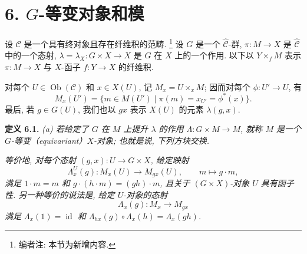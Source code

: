 
\section*{6. \(G\)-等变对象和模}

设 \(\mathscr C\) 是一个具有终对象且存在纤维积的范畴.
\footnote{编者注: 本节为新增内容.}
设 \(G\) 是一个 \(\widehat{\mathscr C}\)-群,
\(\pi:M\to X\) 是 \(\widehat{\mathscr C}\) 中的一个态射,
\(\lambda=\lambda_X:G\times X\to X\) 是 \(G\) 在 \(X\) 上的一个作用.
以下以 \(Y\times_f M\) 表示 \(\pi:M\to X\) 与 \(X\)-函子
\(f:Y\to X\) 的纤维积.

对每个 \(U\in\operatorname{Ob}(\mathscr C)\) 和 \(x\in X(U)\), 记
\(M_x=U\times_x M\); 因而对每个 \(\phi:U'\to U\), 有
\[
  M_x(U')
  =\{m\in M(U')\mid \pi(m)=x_{U'}=\phi^*(x)\}.
\]
最后, 若 \(g\in G(U)\), 我们也以 \(gx\) 表示 \(X(U)\) 的元素
\(\lambda(g,x)\).

\medskip
\noindent{}\textbf{定义 6.1.}
\textit{(a) 若给定了 \(G\) 在 \(M\) 上提升 \(\lambda\) 的作用
\(\Lambda:G\times M\to M\), 就称 \(M\) 是一个 \(G\)-等变（equivariant）\(X\)-对象;
也就是说, 下列方块交换.}

\begin{figure}[H]
  \centering
  
  \label{fig:sga3-exp1-p039-equivariant-action-square}
\end{figure}

\textit{等价地, 对每个态射 \((g,x):U\to G\times X\), 给定映射}
\[
  \Lambda_x^U(g):M_x(U)\longrightarrow M_{gx}(U),
  \qquad m\longmapsto g\cdot m,
\]
\textit{满足 \(1\cdot m=m\) 和
\(g\cdot(h\cdot m)=(gh)\cdot m\), 且关于 \((G\times X)\)-对象
\(U\) 具有函子性. 另一种等价的说法是, 给定 \(U\)-对象的态射}
\[
  \Lambda_x(g):M_x\longrightarrow M_{gx}
\]
\textit{满足
\(\Lambda_x(1)=\operatorname{id}\) 和
\(\Lambda_{hx}(g)\circ\Lambda_x(h)=\Lambda_x(gh)\).}

